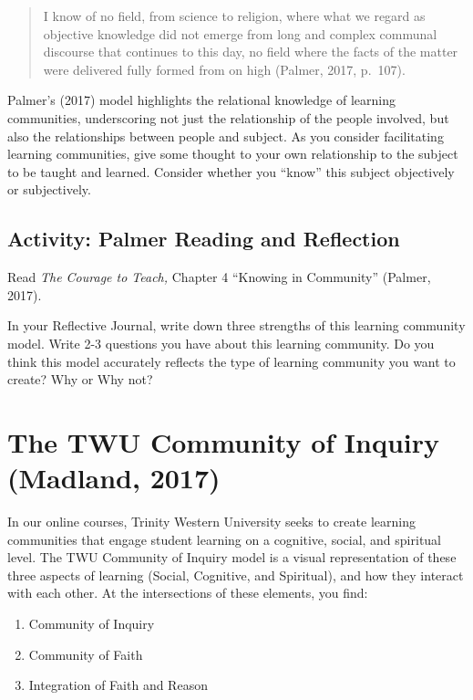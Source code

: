 \documentclass[
]{book}
\providecommand{\tightlist}{%
  \setlength{\itemsep}{0pt}\setlength{\parskip}{0pt}}
\begin{document}
\begin{quote}
I know of no field, from science to religion, where what we regard as objective knowledge did not emerge from long and complex communal discourse that continues to this day, no field where the facts of the matter were delivered fully formed from on high (Palmer, 2017, p.~107).
\end{quote}

Palmer's (2017) model highlights the relational knowledge of learning communities, underscoring not just the relationship of the people involved, but also the relationships between people and subject. As you consider facilitating learning communities, give some thought to your own relationship to the subject to be taught and learned. Consider whether you ``know'' this subject objectively or subjectively.

\hypertarget{activity-palmer-reading-and-reflection-1}{%
\subsection{Activity: Palmer Reading and Reflection}\label{activity-palmer-reading-and-reflection-1}}

\begin{reflect}
Read \emph{The Courage to Teach,} Chapter 4 ``Knowing in Community''
(Palmer, 2017).

In your Reflective Journal, write down three strengths of this learning
community model. Write 2-3 questions you have about this learning
community. Do you think this model accurately reflects the type of
learning community you want to create? Why or Why not?
\end{reflect}

\hypertarget{the-twu-community-of-inquiry-madland-2017}{%
\section{The TWU Community of Inquiry (Madland, 2017)}\label{the-twu-community-of-inquiry-madland-2017}}

In our online courses, Trinity Western University seeks to create learning communities that engage student learning on a cognitive, social, and spiritual level. The TWU Community of Inquiry model is a visual representation of these three aspects of learning (Social, Cognitive, and Spiritual), and how they interact with each other. At the intersections of these elements, you find:

\begin{enumerate}
\def\labelenumi{\arabic{enumi}.}
\tightlist
\item
  Community of Inquiry
\item
  Community of Faith
\item
  Integration of Faith and Reason
\end{enumerate}
\end{document}
